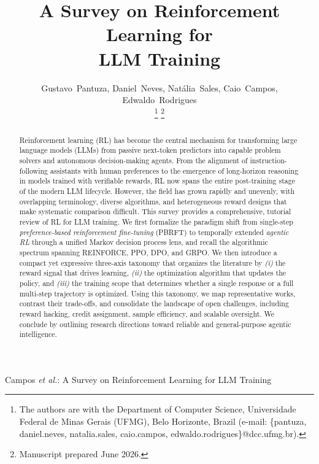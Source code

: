 \documentclass[journal]{IEEEtran}
\begin{document}
\title{A Survey on Reinforcement Learning for \\ LLM Training}

\author{Gustavo~Pantuza,
        Daniel~Neves,
        Nat\'alia~Sales,
        Caio~Campos,
        Edwaldo~Rodrigues
        
\thanks{The authors are with the Department of Computer Science,
Universidade Federal de Minas Gerais (UFMG), Belo Horizonte, Brazil
(e-mail: \{pantuza, daniel.neves, natalia.sales, caio.campos, edwaldo.rodrigues\}@dcc.ufmg.br).}
\thanks{Manuscript prepared June 2026.}}

%
{Campos \MakeLowercase{\textit{et al.}}: A Survey on Reinforcement Learning for LLM Training}

\maketitle

\begin{abstract}
Reinforcement learning (RL) has become the central mechanism for
transforming large language models (LLMs) from passive next-token
predictors into capable problem solvers and autonomous decision-making
agents. From the alignment of instruction-following assistants with
human preferences to the emergence of long-horizon reasoning in
models trained with verifiable rewards, RL now spans the entire
post-training stage of the modern LLM lifecycle. However, the field
has grown rapidly and unevenly, with overlapping terminology, diverse
algorithms, and heterogeneous reward designs that make systematic
comparison difficult. This survey provides a comprehensive, tutorial
review of RL for LLM training. We first formalize the paradigm shift
from single-step \emph{preference-based reinforcement fine-tuning}
(PBRFT) to temporally extended \emph{agentic RL} through a unified
Markov decision process lens, and recall the algorithmic spectrum
spanning REINFORCE, PPO, DPO, and GRPO. We then introduce a compact
yet expressive three-axis taxonomy that organizes the literature by
\emph{(i)} the reward signal that drives learning, \emph{(ii)} the
optimization algorithm that updates the policy, and \emph{(iii)} the
training scope that determines whether a single response or a full
multi-step trajectory is optimized. Using this taxonomy, we map
representative works, contrast their trade-offs, and consolidate the
landscape of open challenges, including reward hacking, credit
assignment, sample efficiency, and scalable oversight. We conclude by
outlining research directions toward reliable and general-purpose
agentic intelligence.
\end{abstract}
\end{document}
